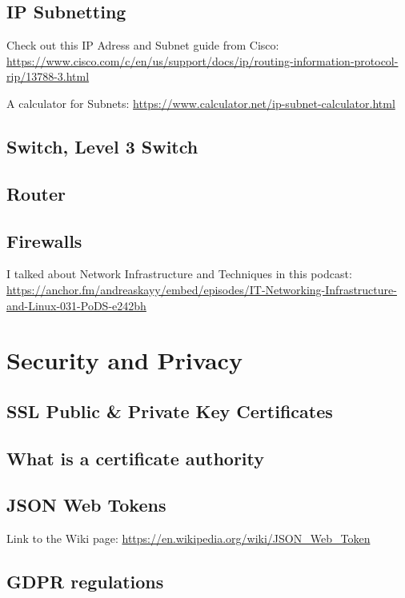 \documentclass[12pt, numbers=noenddot]{scrreprt} %
\begin{document}
\section{IP Subnetting}

Check out this IP Adress and Subnet guide from Cisco: \url{https://www.cisco.com/c/en/us/support/docs/ip/routing-information-protocol-rip/13788-3.html}

A calculator for Subnets: \url{https://www.calculator.net/ip-subnet-calculator.html}

\section{Switch, Level 3 Switch}

\section{Router}

\section{Firewalls}

I talked about Network Infrastructure and Techniques in this podcast: \url{https://anchor.fm/andreaskayy/embed/episodes/IT-Networking-Infrastructure-and-Linux-031-PoDS-e242bh}

\chapter{Security and Privacy}
\section{SSL Public \& Private Key Certificates}

\section{What is a certificate authority}

\section{JSON Web Tokens}

Link to the Wiki page: \url{https://en.wikipedia.org/wiki/JSON_Web_Token}

\section{GDPR regulations}
\end{document}
